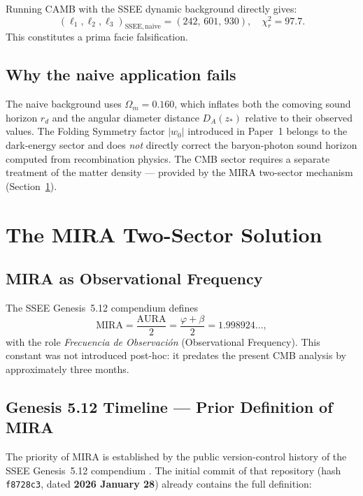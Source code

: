 \documentclass[12pt,a4paper]{article}
\begin{document}
Running CAMB with the SSEE dynamic background directly gives:
\begin{equation}
(\ell_1,\ell_2,\ell_3)_{\mathrm{SSEE,naive}} = (242,\,601,\,930),
\quad \chi^2_r = 97.7.
\end{equation}
This constitutes a prima facie falsification.

\subsection{Why the naive application fails}

The naive background uses $\Omega_m=0.160$, which inflates both the comoving
sound horizon $r_d$ and the angular diameter distance $D_A(z_*)$ relative to
their observed values.  The Folding Symmetry factor $|w_0|$ introduced in
Paper~1 belongs to the dark-energy sector and does \emph{not} directly correct
the baryon-photon sound horizon computed from recombination physics.  The CMB
sector requires a separate treatment of the matter density — provided by the
MIRA two-sector mechanism (Section~\ref{sec:mira}).

\section{The MIRA Two-Sector Solution}
\label{sec:mira}

\subsection{MIRA as Observational Frequency}

The SSEE Genesis~5.12 compendium \citep{AlmeidaSSEE2026genesis} defines
\begin{equation}
\mathrm{MIRA} = \frac{\mathrm{AURA}}{2} = \frac{\varphi+\beta}{2} = 1.998924\ldots,
\end{equation}
with the role \textit{Frecuencia de Observación} (Observational Frequency).
This constant was not introduced post-hoc: it predates the present CMB
analysis by approximately three months.

\subsection{Genesis 5.12 Timeline — Prior Definition of MIRA}
\label{sec:mira_timeline}

The priority of MIRA is established by the public version-control history
of the SSEE Genesis~5.12 compendium \citep{AlmeidaSSEE2026genesis}.
The initial commit of that repository (hash \texttt{f8728c3},
dated \textbf{2026 January 28}) already contains the full definition:
\end{document}
